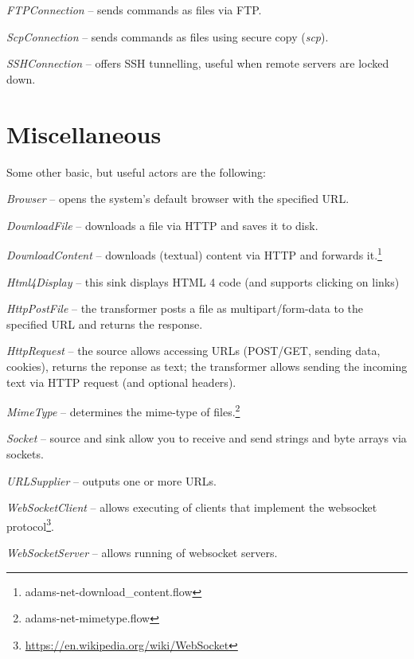 \documentclass[a4paper]{book}
\begin{document}
\begin{tight_itemize}
	\item \textit{FTPConnection} -- sends commands as files via FTP.
	\item \textit{ScpConnection} -- sends commands as files using secure
	copy (\textit{scp}).
	\item \textit{SSHConnection} -- offers SSH tunnelling, useful when
	remote servers are locked down.
\end{tight_itemize}



\chapter{Miscellaneous}
Some other basic, but useful actors are the following:
\begin{tight_itemize}
	\item \textit{Browser} -- opens the system's default browser with the specified
	URL.
	\item \textit{DownloadFile} -- downloads a file via HTTP and saves it to disk.
	\item \textit{DownloadContent} -- downloads (textual) content via HTTP and 
	forwards it.\footnote{adams-net-download\_content.flow}
	\item \textit{Html4Display} -- this sink displays HTML 4 code (and supports clicking on links)
	\item \textit{HttpPostFile} -- the transformer posts a file as multipart/form-data
	to the specified URL and returns the response.
	\item \textit{HttpRequest} -- the source allows accessing URLs (POST/GET, sending data,
	cookies), returns the reponse as text; the transformer allows
	sending the incoming text via HTTP request (and optional headers).
	\item \textit{MimeType} -- determines the mime-type of
	files.\footnote{adams-net-mimetype.flow}
	\item \textit{Socket} -- source and sink allow you to receive and send
	strings and byte arrays via sockets.
	\item \textit{URLSupplier} -- outputs one or more URLs.
	\item \textit{WebSocketClient} -- allows executing of clients that implement
	the websocket protocol\footnote{\url{https://en.wikipedia.org/wiki/WebSocket}{}}.
	\item \textit{WebSocketServer} -- allows running of websocket servers.
\end{tight_itemize}
\end{document}
